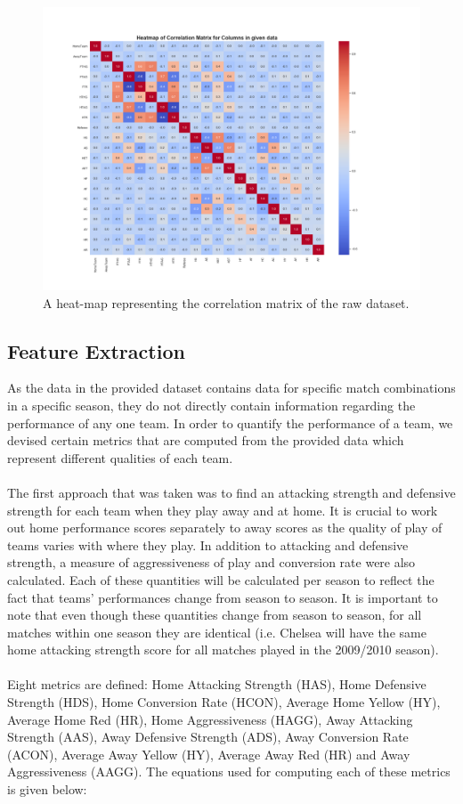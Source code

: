 \documentclass[a4paper,12pt]{article}
\begin{document}
	\begin{figure}[H]
		\renewcommand\thefigure{2.5}
		\centering
		
		\includegraphics[scale=0.35]{raw_corr_heatmap.png}
		\caption{A heat-map representing the correlation matrix of the raw dataset.}
	\end{figure}
	
	\subsection{Feature Extraction}
	
	As the data in the provided dataset contains data for specific match combinations in a specific season, they do not directly contain information regarding the performance of any one team. In order to quantify the performance of a team, we devised certain metrics that are computed from the provided data which represent different qualities of each team. \\
	\\
	The first approach that was taken was to find an attacking strength and defensive strength for each team when they play away and at home. It is crucial to work out home performance scores separately to away scores as the quality of play of teams varies with where they play. In addition to attacking and defensive strength, a measure of aggressiveness of play and conversion rate were also calculated. Each of these quantities will be calculated per season to reflect the fact that teams’ performances change from season to season. It is important to note that even though these quantities change from season to season, for all matches within one season they are identical (i.e. Chelsea will have the same home attacking strength score for all matches played in the 2009/2010 season).\\
	\\
	Eight metrics are defined: Home Attacking Strength (HAS), Home Defensive Strength (HDS), Home Conversion Rate (HCON), Average Home Yellow (HY), Average Home Red (HR), Home Aggressiveness (HAGG), Away Attacking Strength (AAS), Away Defensive Strength (ADS), Away Conversion Rate (ACON), Average Away Yellow (HY), Average Away Red (HR) and Away Aggressiveness (AAGG). The equations used for computing each of these metrics is given below:
	
\end{document}
